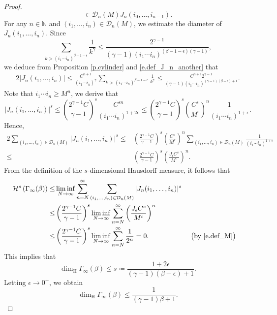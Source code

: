 \documentclass[12pt,reqno]{amsart}
\renewcommand{\=}{\coloneqq}
\theoremstyle{plain}
\begin{document}
\begin{proof}
\begin{equation}
{                \in \mathcal{D}_n(M)}J_n(i_0,\dots,i_{n-1}).
        \end{equation}
For any $n \in \mathbb N$ and $(i_1,\dots, i_{n})\in \mathcal{D} _n(M)$, we estimate the diameter of $J_n(i_1,\dots,i_{n})$. Since
$$
\sum_{k>(i_1\cdots i_{n})
        ^{\beta-1-\epsilon}}\frac{1}{k^{\gamma}} \leq \frac{2^{\gamma-1}}
        {(\gamma-1)(i_1\cdots i_{n})^{(\beta-1-\epsilon)(\gamma-1)}},
$$
we deduce from Proposition \ref{p.cylinder} and \eqref{e.def_J_n_another} that
     \begin{alignat*}{2}
        |J_n(i_1,\dots,i_{n})|\leq\frac{C^{n+1}}
        {(i_1\cdots i_{n})^{\gamma}}
        \sum_{k>(i_1\cdots i_{n})
        ^{\beta-1-\epsilon}}\frac{1}{k^{\gamma}}
       \leq \frac{C^{n+1}2^{\gamma-1}}
        {(\gamma-1)(i_1\cdots i_{n})^{(\gamma-1)(\beta-\epsilon)+1}}.
        \end{alignat*}
Note that $i_1\cdots i_{n}\geq M^n$, we derive that
 \begin{equation*}\label{J^s}
|J_n(i_1,\dots,i_{n})|^s \leq \left(\frac{2^{\gamma-1}C}{\gamma-1}\right)^s \frac{C^{sn}}
        {(i_1\cdots i_{n})^{1+2\epsilon}} \leq \left(\frac{2^{\gamma-1}C}{\gamma-1}\right)^s \left(\frac{C^{s}}{M^\epsilon}\right)^n \frac{1}
        {(i_1\cdots i_{n})^{1+\epsilon}}.
 \end{equation*}
 Hence,
\begin{alignat*}{2}
 \sum_{(i_1,\dots, i_{n})\in \mathcal{D} _n(M)}|J_n(i_1,\dots,i_{n})|^s \leq &\left(\frac{2^{\gamma-1}C}{\gamma-1}\right)^s \left(\frac{C^{s}}{M^\epsilon}\right)^n \sum_{(i_1,\dots, i_{n})\in \mathcal{D} _n(M)} \frac{1}
        {(i_1\cdots i_{n})^{1+\epsilon}}\\
\leq & \left(\frac{2^{\gamma-1}C}{\gamma-1}\right)^s \left(\frac{J_\epsilon C^{s}}{M^\epsilon}\right)^n.
\end{alignat*}
From the definition of the $s$-dimensional Hausdorff measure, it follows that
 \begin{alignat*}{2}
 \mathcal{H}^{s}\left({\Gamma}_{\infty}(\beta)\right)
                \leq& \liminf_{N \to \infty}
                \sum_{n=N}^{\infty}
                \sum_{(i_1,\dots, i_{n})
                \in \mathcal{D} _n(M)}
                |J_n(i_1,\dots,i_{n})|^s \\
                \leq & \left(\frac{2^{\gamma-1}C}{\gamma-1}\right)^s \liminf_{N \to \infty}
                \sum_{n=N}^{\infty}\left(\frac{J_\epsilon C^{s}}{M^\epsilon}\right)^n\\
                 \leq & \left(\frac{2^{\gamma-1}C}{\gamma-1}\right)^s \liminf_{N \to \infty}
                \sum_{n=N}^{\infty} \frac{1}{2^n} =0. && \  \big(\text{by}\ \eqref{e.def_M}\big)
        \end{alignat*}
This implies that
 \begin{equation*}
                \dim_{\mathrm{H}}
              {\Gamma}_{\infty}(\beta)
                \leq s\coloneqq \frac{1+2\epsilon}{(\gamma-1)(\beta-\epsilon)+1}.
        \end{equation*}
 Letting $\epsilon\to 0^{+}$, we obtain $$\dim_{\mathrm{H}}{\Gamma}_{\infty}
        (\beta)\leq \frac{1}{(\gamma-1)\beta+1}.$$



\end{proof}
\end{document}
